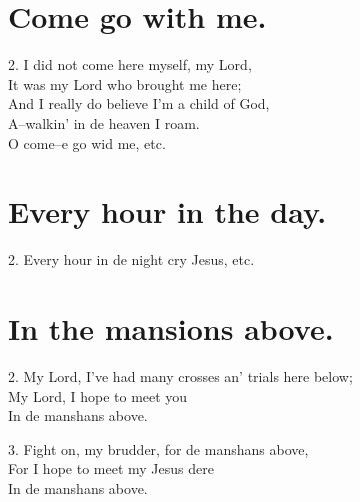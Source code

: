 \documentclass[a5paper,10pt]{book}
\begin{document}
\newpage
\section{Come go with me.}
\thispagestyle{empty}

\begin{song}
\end{song}

\begin{stanza}
\item[2.]
  I did not come here myself, my Lord,\\
  It was my Lord who brought me here;\\
  And I really do believe I'm a child of God,\\
  A--walkin' in de heaven I roam.\\
  O come--e go wid me, etc.
\end{stanza}


\newpage
\section{Every hour in the day.}
\thispagestyle{empty}

\begin{song}
\end{song}

\begin{stanza}
\item[2.]
  Every hour in de night cry Jesus, etc.
\end{stanza}


\newpage
\section{In the mansions above.}
\thispagestyle{empty}

\begin{song}
\end{song}

\begin{stanza}
\item[2.]
  My Lord, I've had many crosses an' trials here below;\\
  My Lord, I hope to meet you\\
  In de manshans above.
\item[3.]
  Fight on, my brudder, for de manshans above,\\
  For I hope to meet my Jesus dere\\
  In de manshans above.
\end{stanza}
\end{document}
